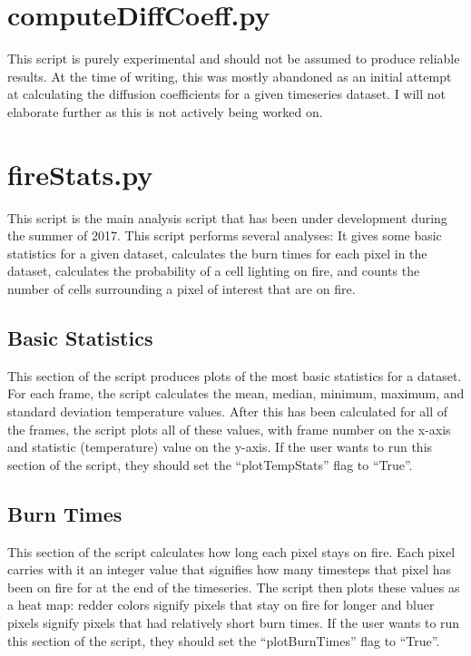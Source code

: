 \documentclass{article}
\begin{document}
\section{computeDiffCoeff.py}

This script is purely experimental and should not be assumed to produce reliable results. At the time of writing, this was mostly abandoned as an initial attempt at calculating the diffusion coefficients for a given timeseries dataset. I will not elaborate further as this is not actively being worked on. 


\section{fireStats.py}

This script is the main analysis script that has been under development during the summer of 2017. This script performs several analyses: It gives some basic statistics for a given dataset, calculates the burn times for each pixel in the dataset, calculates the probability of a cell lighting on fire, and counts the number of cells surrounding a pixel of interest that are on fire. 
\subsection{Basic Statistics}
This section of the script produces plots of the most basic statistics for a dataset. For each frame, the script calculates the mean, median, minimum, maximum, and standard deviation temperature values. After this has been calculated for all of the frames, the script plots all of these values, with frame number on the x-axis and statistic (temperature) value on the y-axis. If the user wants to run this section of the script, they should set the ``plotTempStats'' flag to ``True''.


\subsection{Burn Times}

This section of the script calculates how long each pixel stays on fire. Each pixel carries with it an integer value that signifies how many timesteps that pixel has been on fire for at the end of the timeseries. The script then plots these values as a heat map: redder colors signify pixels that stay on fire for longer and bluer pixels signify pixels that had relatively short burn times. If the user wants to run this section of the script, they should set the ``plotBurnTimes'' flag to ``True''. 
\end{document}
